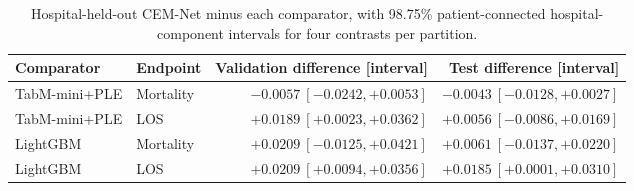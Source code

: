 \begin{table}[tp]
\centering\footnotesize
\setlength{\tabcolsep}{3pt}
\caption{Hospital-held-out CEM-Net minus each comparator, with 98.75\% patient-connected hospital-component intervals for four contrasts per partition.}
\label{tab:hospital-pairs}
\begin{tabular}{llrr}
\toprule
Comparator & Endpoint & Validation difference [interval] & Test difference [interval] \\
\midrule
TabM-mini+PLE & Mortality & $-0.0057\ [-0.0242,+0.0053]$ & $-0.0043\ [-0.0128,+0.0027]$ \\
TabM-mini+PLE & LOS & $+0.0189\ [+0.0023,+0.0362]$ & $+0.0056\ [-0.0086,+0.0169]$ \\
LightGBM & Mortality & $+0.0209\ [-0.0125,+0.0421]$ & $+0.0061\ [-0.0137,+0.0220]$ \\
LightGBM & LOS & $+0.0209\ [+0.0094,+0.0356]$ & $+0.0185\ [+0.0001,+0.0310]$ \\
\bottomrule
\end{tabular}
\end{table}
